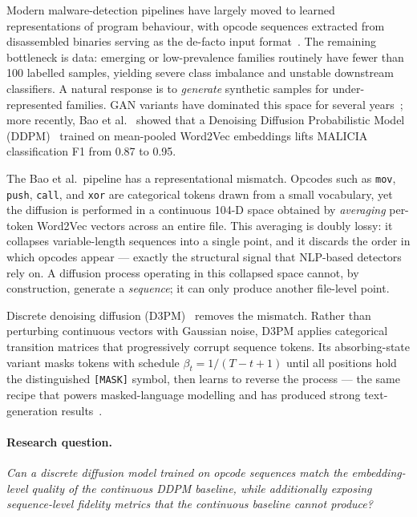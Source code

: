 \documentclass[runningheads]{llncs}
\newcommand{\opcode}[1]{\texttt{#1}}
\begin{document}
Modern malware-detection pipelines have largely moved to learned representations
of program behaviour, with opcode sequences extracted from disassembled binaries
serving as the de-facto input format~\cite{kale2023bert,mehta2024nlp,mimura2022nlp}.
The remaining bottleneck is data: emerging or low-prevalence families routinely
have fewer than 100 labelled samples, yielding severe class imbalance and
unstable downstream classifiers. A natural response is to \emph{generate}
synthetic samples for under-represented families. GAN variants have dominated
this space for several years~\cite{lu2019gan,trehan2022hmmgan,tran2022word2vec,choi2024vaegan};
more recently, Bao et al.~\cite{bao2025diffusion} showed that a Denoising
Diffusion Probabilistic Model (DDPM)~\cite{ho2020ddpm} trained on
mean-pooled Word2Vec embeddings lifts MALICIA classification F1 from 0.87
to 0.95.

The Bao et al.\ pipeline has a representational mismatch. Opcodes such as
\opcode{mov}, \opcode{push}, \opcode{call}, and \opcode{xor} are categorical
tokens drawn from a small vocabulary, yet the diffusion is performed in a
continuous 104-D space obtained by \emph{averaging} per-token Word2Vec vectors
across an entire file. This averaging is doubly lossy: it collapses
variable-length sequences into a single point, and it discards the order in
which opcodes appear --- exactly the structural signal that NLP-based detectors
rely on. A diffusion process operating in this collapsed space cannot, by
construction, generate a \emph{sequence}; it can only produce another
file-level point.

Discrete denoising diffusion (D3PM)~\cite{austin2021d3pm} removes the mismatch.
Rather than perturbing continuous vectors with Gaussian noise, D3PM applies
categorical transition matrices that progressively corrupt sequence tokens.
Its absorbing-state variant masks tokens with schedule $\beta_t = 1/(T-t+1)$
until all positions hold the distinguished \texttt{[MASK]} symbol, then learns
to reverse the process --- the same recipe that powers masked-language
modelling and has produced strong text-generation results~\cite{austin2021d3pm,sahoo2024mdlm,lou2024sedd}.

\paragraph{Research question.}
\emph{Can a discrete diffusion model trained on opcode sequences match the
embedding-level quality of the continuous DDPM baseline, while additionally
exposing sequence-level fidelity metrics that the continuous baseline cannot
produce?}
\end{document}

